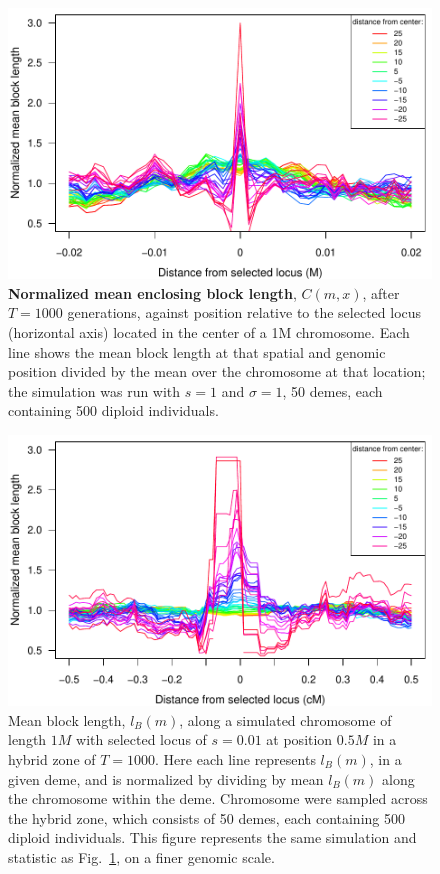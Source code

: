 \documentclass[11pt,letterpaper]{article}
\begin{document}
\begin{figure}
\includegraphics{figs/blocksAlongChromAncBConditioning}
\caption{
    \textbf{Normalized mean enclosing block length}, $C(m,x)$, after $T=1000$ generations,
    against position relative to the selected locus (horizontal axis)
    located in the center of a 1M chromosome.
    Each line shows the mean block length at that spatial and genomic position
    divided by the mean over the chromosome at that location;
    the simulation was run with $s=1$ and $\sigma=1$,
    50 demes, each containing 500 diploid individuals.
}\label{Fig:blockLengths}
\end{figure}



\begin{figure}
\includegraphics{figs/blocksAlongChromAncBConditioningHighRes}
\caption{Mean block length, $l_B(m)$, along a simulated chromosome of length $1M$ with selected locus of $s=0.01$ at position $0.5M$ in a hybrid zone of $T=1000$. Here each line represents  $l_B(m)$, in a given deme, and is normalized by dividing by mean $l_B(m)$ along the chromosome within the deme. Chromosome were sampled across the hybrid zone, which consists of 50 demes, each containing 500 diploid individuals. This figure represents the same simulation and statistic as Fig.~\ref{Fig:blockLengths}, on a finer genomic scale.
}\label{Fig:blockLengthsZoom}
\end{figure}
\end{document}
